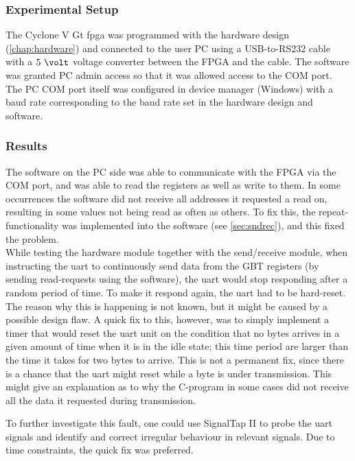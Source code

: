 \documentclass[main.tex]{subfiles}
\begin{document}
\subsubsection{Experimental Setup}

The Cyclone V Gt \gls{fpga} was programmed with the hardware design (\ref{chap:hardware}) and connected to the user PC using a USB-to-RS232 cable with a $5~\volt$ voltage converter between the FPGA and the cable. The software was granted PC admin access so that it was allowed access to the COM port. The PC COM port itself was configured in device manager (Windows) with a baud rate corresponding to the baud rate set in the hardware design and software. 

\subsubsection{Results}

The software on the PC side was able to communicate with the FPGA via the COM port, and was able to read the registers as well as write to them. In some occurrences the software did not receive all addresses it requested a read on, resulting in some values not being read as often as others. To fix this, the repeat-functionality was implemented into the software (see \ref{sec:sndrec}), and this fixed the problem.\\

While testing the hardware module together with the send/receive module, when instructing the \gls{uart} to continuously send data from the GBT registers (by sending read-requests using the software), the \gls{uart} would stop responding after a random period of time. To make it respond again, the \gls{uart} had to be hard-reset. The reason why this is happening is not known, but it might be caused by a possible design flaw. A quick fix to this, however, was to simply implement a timer that would reset the \gls{uart} unit on the condition that no bytes arrives in a given amount of time when it is in the idle state; this time period are larger than the time it takes for two bytes to arrive. This is not a permanent fix, since there is a chance that the \gls{uart} might reset while a byte is under transmission. This might give an explanation as to why the C-program in some cases did not receive all the data it requested during transmission.

To further investigate this fault, one could use SignalTap II to probe the \gls{uart} signals and identify and correct irregular behaviour in relevant signals. Due to time constraints, the quick fix was preferred.
\end{document}
